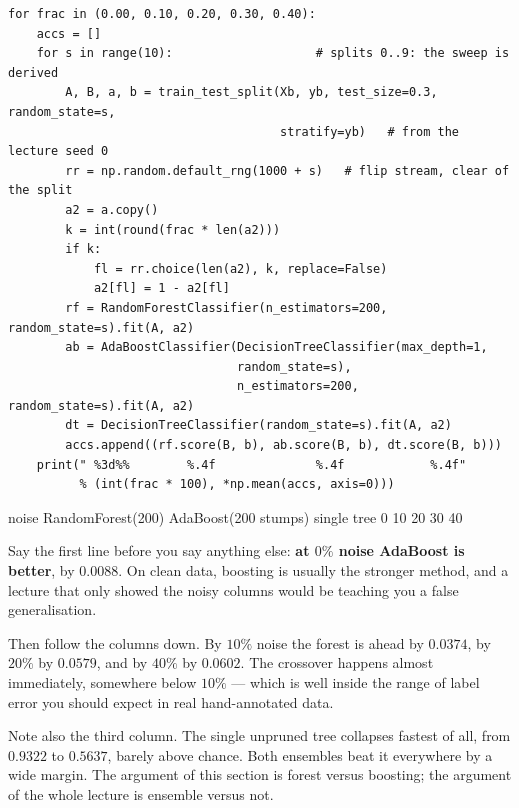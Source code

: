 \documentclass[11pt]{article}
\begin{document}
\begin{lstlisting}
for frac in (0.00, 0.10, 0.20, 0.30, 0.40):
    accs = []
    for s in range(10):                    # splits 0..9: the sweep is derived
        A, B, a, b = train_test_split(Xb, yb, test_size=0.3, random_state=s,
                                      stratify=yb)   # from the lecture seed 0
        rr = np.random.default_rng(1000 + s)   # flip stream, clear of the split
        a2 = a.copy()
        k = int(round(frac * len(a2)))
        if k:
            fl = rr.choice(len(a2), k, replace=False)
            a2[fl] = 1 - a2[fl]
        rf = RandomForestClassifier(n_estimators=200, random_state=s).fit(A, a2)
        ab = AdaBoostClassifier(DecisionTreeClassifier(max_depth=1,
                                random_state=s),
                                n_estimators=200, random_state=s).fit(A, a2)
        dt = DecisionTreeClassifier(random_state=s).fit(A, a2)
        accs.append((rf.score(B, b), ab.score(B, b), dt.score(B, b)))
    print(" %3d%%        %.4f              %.4f            %.4f"
          % (int(frac * 100), *np.mean(accs, axis=0)))
\end{lstlisting}
\begin{codeout}
noise   RandomForest(200)   AdaBoost(200 stumps)   single tree
   0%
  10%
  20%
  30%
  40%
\end{codeout}

Say the first line before you say anything else: \textbf{at $0\%$ noise
AdaBoost is better}, by $0.0088$. On clean data, boosting is usually the
stronger method, and a lecture that only showed the noisy columns would be
teaching you a false generalisation.

Then follow the columns down. By $10\%$ noise the forest is ahead by $0.0374$,
by $20\%$ by $0.0579$, and by $40\%$ by $0.0602$. The crossover happens almost
immediately, somewhere below $10\%$ --- which is well inside the range of label
error you should expect in real hand-annotated data.

Note also the third column. The single unpruned tree collapses fastest of all,
from $0.9322$ to $0.5637$, barely above chance. Both ensembles beat it
everywhere by a wide margin. The argument of this section is forest versus
boosting; the argument of the whole lecture is ensemble versus not.
\end{document}
